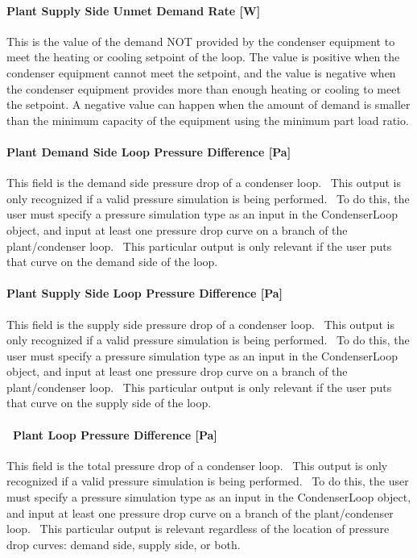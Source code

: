 \paragraph{Plant Supply Side Unmet Demand Rate {[}W{]}}\label{plant-supply-side-unmet-demand-rate-w-1}

This is the value of the demand NOT provided by the condenser equipment to meet the heating or cooling setpoint of the loop. The value is positive when the condenser equipment cannot meet the setpoint, and the value is negative when the condenser equipment provides more than enough heating or cooling to meet the setpoint. A negative value can happen when the amount of demand is smaller than the minimum capacity of the equipment using the minimum part load ratio.

\paragraph{Plant Demand Side Loop Pressure Difference {[}Pa{]}}\label{plant-demand-side-loop-pressure-difference-pa-1}

This field is the demand side pressure drop of a condenser loop.~ This output is only recognized if a valid pressure simulation is being performed.~ To do this, the user must specify a pressure simulation type as an input in the CondenserLoop object, and input at least one pressure drop curve on a branch of the plant/condenser loop.~ This particular output is only relevant if the user puts that curve on the demand side of the loop.

\paragraph{Plant Supply Side Loop Pressure Difference {[}Pa{]}}\label{plant-supply-side-loop-pressure-difference-pa-1}

This field is the supply side pressure drop of a condenser loop.~ This output is only recognized if a valid pressure simulation is being performed.~ To do this, the user must specify a pressure simulation type as an input in the CondenserLoop object, and input at least one pressure drop curve on a branch of the plant/condenser loop.~ This particular output is only relevant if the user puts that curve on the supply side of the loop.

\paragraph{~Plant Loop Pressure Difference {[}Pa{]}}\label{plant-loop-pressure-difference-pa-1}

This field is the total pressure drop of a condenser loop.~ This output is only recognized if a valid pressure simulation is being performed.~ To do this, the user must specify a pressure simulation type as an input in the CondenserLoop object, and input at least one pressure drop curve on a branch of the plant/condenser loop.~ This particular output is relevant regardless of the location of pressure drop curves: demand side, supply side, or both.
